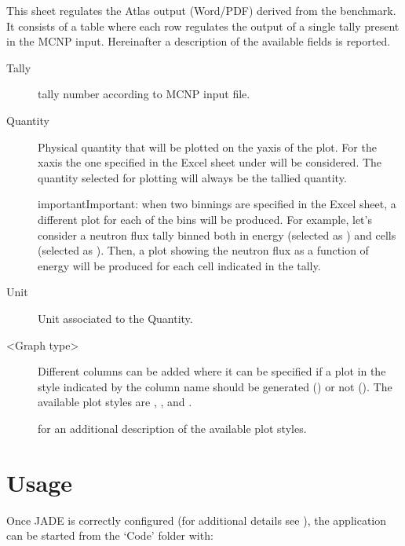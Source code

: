 \documentclass[letterpaper,10pt,english]{sphinxmanual}
\begin{document}
This sheet regulates the Atlas output (Word/PDF) derived from the benchmark. It consists of a table where each row regulates
the output of a single tally present in the MCNP input.
Hereinafter a description of the available fields is reported.
\begin{description}
\item[{Tally}] \leavevmode
tally number according to MCNP input file.

\item[{Quantity}] \leavevmode
Physical quantity that will be plotted on the y\sphinxhyphen{}axis of the plot. For the x\sphinxhyphen{}axis the one specified in the Excel sheet
under  will be considered. The quantity selected for plotting will always be the tallied quantity.

\begin{sphinxadmonition}{important}{Important:}
when two binnings are specified in the Excel sheet, a different plot for each of the  bins will be produced.
For example, let’s consider a neutron flux tally binned both in energy (selected as ) and cells (selected as ).
Then, a plot showing the neutron flux as a function of energy will be produced for each cell indicated in the tally.
\end{sphinxadmonition}

\item[{Unit}] \leavevmode
Unit associated to the Quantity.

\item[{\textless{}Graph type\textgreater{}}] \leavevmode
Different columns can be added where it can be specified if a plot in the style indicated by the column name
should be generated () or not (). The available plot styles are , ,
 and .




{\hyperref[\detokenize{usage/postprocessing:plotstyles}]{}} for an additional description of the available plot styles.



\end{description}


\chapter{Usage}
\label{\detokenize{usage/menu:usage}}\label{\detokenize{usage/menu:menu}}\label{\detokenize{usage/menu::doc}}
Once JADE is correctly configured
(for additional details see {\hyperref[\detokenize{usage/configuration:config}]{}}), the application can be started
from the ‘Code’ folder with:
\end{document}
